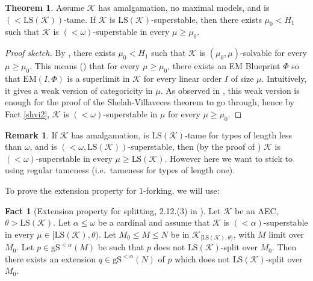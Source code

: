 \documentclass[12pt]{amsart}
\theoremstyle{definition}
\newtheorem{thm}[mydef]{Theorem}
\newtheorem{remark}[mydef]{Remark}
\newtheorem{fact}[mydef]{Fact}
\begin{document}
\begin{thm}\label{tame-long-ss}
  Assume ${\mathcal{K}}$ has amalgamation, no maximal models, and is $(<{\text{LS}} ({\mathcal{K}}))$-tame. If ${\mathcal{K}}$ is ${\text{LS}} ({\mathcal{K}})$-superstable, then there exists $\mu_0 < H_1$ such that ${\mathcal{K}}$ is $(<\omega)$-superstable in every $\mu \ge \mu_0$.
\end{thm}
\begin{proof}[Proof sketch]
  By \cite[Theorem 5.43]{gv-superstability-v2}, there exists $\mu_0 < H_1$ such that ${\mathcal{K}}$ is $(\mu_0, \mu)$-solvable for every $\mu \ge \mu_0$. This means (\cite[Definition IV.1.4.(1)]{shelahaecbook}) that for every $\mu \ge \mu_0$, there exists an EM Blueprint $\Phi$ so that $\text{EM} (I, \Phi)$ is a superlimit in ${\mathcal{K}}$ for every linear order $I$ of size $\mu$. Intuitively, it gives a weak version of categoricity in $\mu$. As observed in \cite[Section 6]{gv-superstability-v2}, this weak version is enough for the proof of the Shelah-Villaveces theorem to go through, hence by Fact \ref{shvi2}, ${\mathcal{K}}$ is $(<\omega)$-superstable in $\mu$ for every $\mu \ge \mu_0$.
\end{proof}
\begin{remark}
  If ${\mathcal{K}}$ has amalgamation, is ${\text{LS}} ({\mathcal{K}})$-tame for types of length less than $\omega$, and is $(<\omega, {\text{LS}} ({\mathcal{K}}))$-superstable, then (by the proof of \cite[Proposition 10.10]{indep-aec-v5}) ${\mathcal{K}}$ is $(<\omega)$-superstable in every $\mu \ge {\text{LS}} ({\mathcal{K}})$. However here we want to stick to using regular tameness (i.e.\ tameness for types of length one).
\end{remark}

To prove the extension property for $1$-forking, we will use:

\begin{fact}[Extension property for splitting, 2.12.(3) in \cite{vv-structure-categ-v2}]\label{ext-splitting}
  Let ${\mathcal{K}}$ be an AEC, $\theta > {\text{LS}} ({\mathcal{K}})$. Let $\alpha \le \omega$ be a cardinal and assume that ${\mathcal{K}}$ is $(<\alpha)$-superstable in every $\mu \in [{\text{LS}} ({\mathcal{K}}), \theta)$. Let $M_0 {\le} M {\le} N$ be in ${\mathcal{K}}_{[{\text{LS}} ({\mathcal{K}}), \theta)}$, with $M$ limit over $M_0$. Let $p \in {\text{gS}}^{<\alpha} (M)$ be such that $p$ does not ${\text{LS}} ({\mathcal{K}})$-split over $M_0$. Then there exists an extension $q \in {\text{gS}}^{<\alpha} (N)$ of $p$ which does not ${\text{LS}} ({\mathcal{K}})$-split over $M_0$.
\end{fact}
\end{document}

